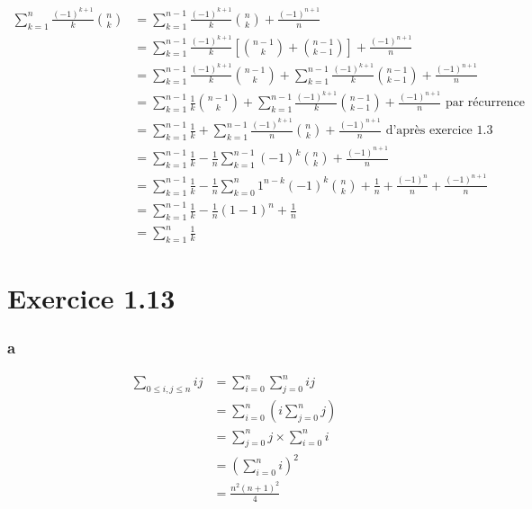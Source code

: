 \documentclass{report}
\begin{document}
\begin{equation*}
	\begin{split}
		\sum_{k=1}^{n} \frac{(-1)^{k+1}}{k}\binom{n}{k}
			&= 	\sum_{k=1}^{n-1} \frac{(-1)^{k+1}}{k}\binom{n}{k} + \frac{(-1)^{n+1}}{n} \\
			&= 	\sum_{k=1}^{n-1} \frac{(-1)^{k+1}}{k}\left[\binom{n-1}{k} + \binom{n-1}{k-1}\right] + \frac{(-1)^{n+1}}{n} \\
			&= 	\sum_{k=1}^{n-1} \frac{(-1)^{k+1}}{k}\binom{n-1}{k} + \sum_{k=1}^{n-1} \frac{(-1)^{k+1}}{k}\binom{n-1}{k-1} + \frac{(-1)^{n+1}}{n} \\
			&= 	\sum_{k=1}^{n-1} \frac{1}{k}\binom{n-1}{k} + \sum_{k=1}^{n-1} \frac{(-1)^{k+1}}{k}\binom{n-1}{k-1} + \frac{(-1)^{n+1}}{n} \text{ par récurrence} \\
			&= 	\sum_{k=1}^{n-1} \frac{1}{k} + \sum_{k=1}^{n-1} \frac{(-1)^{k+1}}{n}\binom{n}{k} + \frac{(-1)^{n+1}}{n} \text{ d'après exercice 1.3} \\
			&= 	\sum_{k=1}^{n-1} \frac{1}{k} - \frac{1}{n} \sum_{k=1}^{n-1} (-1)^{k}\binom{n}{k} + \frac{(-1)^{n+1}}{n} \\
			&= 	\sum_{k=1}^{n-1} \frac{1}{k} - \frac{1}{n} \sum_{k=0}^{n} 1^{n-k}(-1)^{k}\binom{n}{k} + \frac{1}{n} + \frac{(-1)^{n}}{n} + \frac{(-1)^{n+1}}{n} \\
			&= 	\sum_{k=1}^{n-1} \frac{1}{k} - \frac{1}{n} (1-1)^n + \frac{1}{n} \\
			&= 	\sum_{k=1}^{n} \frac{1}{k}
	\end{split}
\end{equation*}

\section*{Exercice 1.13}

\subsubsection*{a}
\begin{equation*}
	\begin{split}
		\sum_{0 \le i,j \le n} ij &= \sum_{i=0}^{n} \sum_{j=0}^{n} ij \\
		&= \sum_{i=0}^{n} \left(i \sum_{j=0}^{n} j \right)\\
		&= \sum_{j=0}^{n} j \times \sum_{i=0}^{n} i \\
		&= \left(\sum_{i=0}^{n} i \right)^2 \\
		&= \frac{n^2(n+1)^2}{4}
	\end{split}
\end{equation*}
\end{document}
